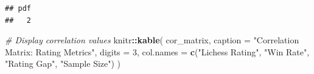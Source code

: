 \documentclass[
]{article}
\newenvironment{Shaded}{\begin{snugshade}}{\end{snugshade}}
\newcommand{\AttributeTok}[1]{\textcolor[rgb]{0.13,0.29,0.53}{#1}}
\newcommand{\CommentTok}[1]{\textcolor[rgb]{0.56,0.35,0.01}{\textit{#1}}}
\newcommand{\DecValTok}[1]{\textcolor[rgb]{0.00,0.00,0.81}{#1}}
\newcommand{\FunctionTok}[1]{\textcolor[rgb]{0.13,0.29,0.53}{\textbf{#1}}}
\newcommand{\NormalTok}[1]{#1}
\newcommand{\SpecialCharTok}[1]{\textcolor[rgb]{0.81,0.36,0.00}{\textbf{#1}}}
\newcommand{\StringTok}[1]{\textcolor[rgb]{0.31,0.60,0.02}{#1}}
\begin{document}
\begin{verbatim}
## pdf 
##   2
\end{verbatim}

\begin{Shaded}
\begin{Highlighting}[]
\CommentTok{\# Display correlation values}
\NormalTok{knitr}\SpecialCharTok{::}\FunctionTok{kable}\NormalTok{(}
\NormalTok{  cor\_matrix,}
  \AttributeTok{caption =} \StringTok{"Correlation Matrix: Rating Metrics"}\NormalTok{,}
  \AttributeTok{digits =} \DecValTok{3}\NormalTok{,}
  \AttributeTok{col.names =} \FunctionTok{c}\NormalTok{(}\StringTok{"Lichess Rating"}\NormalTok{, }\StringTok{"Win Rate"}\NormalTok{, }\StringTok{"Rating Gap"}\NormalTok{, }\StringTok{"Sample Size"}\NormalTok{)}
\NormalTok{)}
\end{Highlighting}
\end{Shaded}
\end{document}
